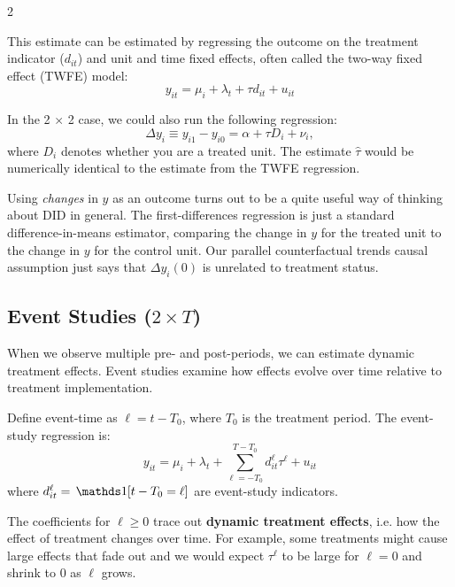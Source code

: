 \documentclass[12pt]{article}
\begin{document}
\begin{multicols}{2}

This estimate can be estimated by regressing the outcome on the treatment indicator ($d_{it}$) and unit and time fixed effects, often called the two-way fixed effect (TWFE) model:
$$
  y_{it} = \mu_i + \lambda_t + \tau d_{it} + u_{it}
$$

In the 2 $\times$ 2 case, we could also run the following regression:
$$
  \Delta y_{i} \equiv y_{i1} - y_{i0} = \alpha + \tau D_i + \nu_i,
$$
where $D_i$ denotes whether you are a treated unit. 
The estimate $\hat{\tau}$ would be numerically identical to the estimate from the TWFE regression.

Using \emph{changes} in $y$ as an outcome turns out to be a quite useful way of thinking about DID in general.
The first-differences regression is just a standard difference-in-means estimator, comparing the change in $y$ for the treated unit to the change in $y$ for the control unit.
Our parallel counterfactual trends causal assumption just says that $\Delta y_i(0)$ is unrelated to treatment status.


\subsection*{Event Studies ($2 \times T$)}

When we observe multiple pre- and post-periods, we can estimate dynamic treatment effects.
Event studies examine how effects evolve over time relative to treatment implementation.

Define event-time as $\ell = t - T_0$, where $T_0$ is the treatment period.
The event-study regression is:
$$
  y_{it} = \mu_i + \lambda_t + \sum_{\ell = -T_0}^{T-T_0} d_{it}^\ell \tau^\ell + u_{it}
$$
where $d_{it}^\ell = \one{t - T_0 = \ell}$ are event-study indicators.

The coefficients for $\ell \geq 0$ trace out \textbf{dynamic treatment effects}, i.e. how the effect of treatment changes over time. 
For example, some treatments might cause large effects that fade out and we would expect $\tau^\ell$ to be large for $\ell = 0$ and shrink to 0 as $\ell$ grows.


\end{multicols}
\end{document}
